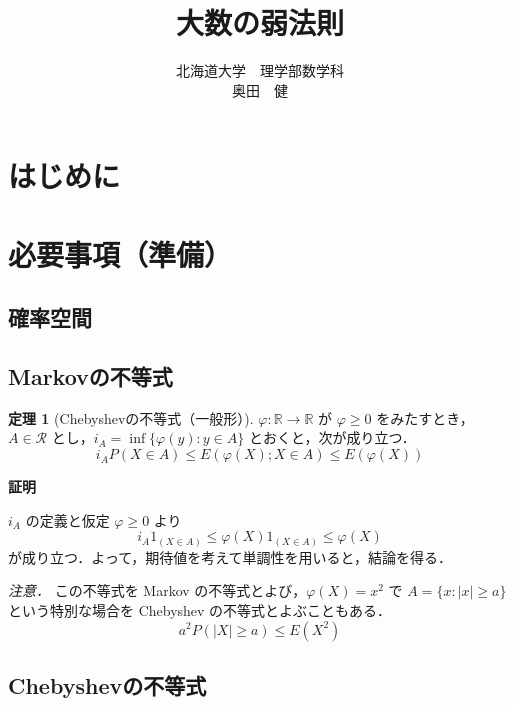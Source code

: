 \documentclass[dvipdfmx]{jsarticle}
\title{\bf 大数の弱法則}
\author{北海道大学　理学部数学科 \\ 奥田　健}
\date{}
\makeatletter
\numberwithin{equation}{section}
\theoremstyle{definition}
\newtheorem{thm}{定理}[section]
\renewenvironment{proof}[1][\proofname]{\par
  \pushQED{\qed}%
  \normalfont \topsep6\p@\@plus6\p@\relax
  \trivlist
  \item\relax
  {\bfseries
  #1\@addpunct{.}}\hspace\labelsep\ignorespaces
}{%
  \popQED\endtrivlist\@endpefalse
}
\renewcommand{\proofname}{証明}
\newcommand{\R}{\mathbb{R}}
\newcommand{\0}{\bm{0}}
\newcommand{\1}{\bm{1}}
\makeatother
\begin{document}
\maketitle{}

\section{はじめに}

\section{必要事項（準備）}

\subsection{確率空間}

\subsection{Markovの不等式}

\begin{thm}[Chebyshevの不等式（一般形）]
$\varphi : \R \to \R$ が $\varphi \ge 0$ をみたすとき，$A \in \mathcal{R}$ とし，$i_A = \inf\{\varphi(y) : y \in A\}$ とおくと，次が成り立つ．
\[
  i_A P(X \in A) \le E(\varphi(X) ; X \in A) \le E(\varphi(X))
\]
\end{thm}

\begin{proof}
$i_A$ の定義と仮定 $\varphi \ge 0$ より
\[
  i_A 1_{(X \in A)} \le \varphi(X) 1_{(X \in A)} \le \varphi(X)
\]
が成り立つ．よって，期待値を考えて単調性を用いると，結論を得る．
\end{proof}

\emph{注意．} この不等式を Markov の不等式とよび，$\varphi(X) = x^2$ で $A = \{x : |x| \ge a\}$ という特別な場合を Chebyshev の不等式とよぶこともある．
\[
  a^2 P(|X| \ge a) \le E(X^2)
\]

\subsection{Chebyshevの不等式}
\end{document}
